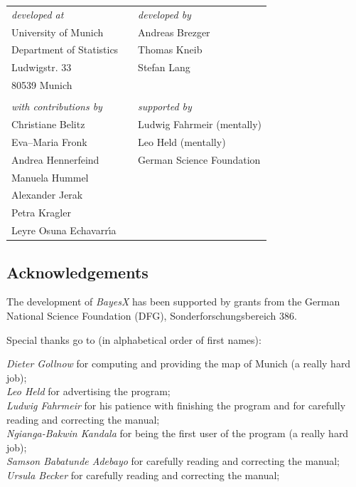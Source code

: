 \begin{table}[ht]
\begin{center}
\begin{tabular}{lll}
{\em developed at} & \hspace{1.5cm} & {\em developed by} \\
University of Munich & \hspace{1.5cm} & Andreas Brezger \\
Department of Statistics & \hspace{1.5cm} & Thomas Kneib \\
Ludwigstr. 33 & \hspace{1.5cm} & Stefan Lang \\
80539 Munich & \hspace{1.5cm} & \\
  & & \\
{\em with contributions by}  &  \hspace{1.5cm} &  {\em supported by} \\
Christiane Belitz&  \hspace{1.5cm} & Ludwig Fahrmeir (mentally) \\
Eva--Maria Fronk  & \hspace{1.5cm} & Leo Held (mentally) \\
Andrea Hennerfeind & \hspace{1.5cm} & German Science Foundation  \\
Manuela Hummel & \\
Alexander Jerak & \\
Petra Kragler & \\
Leyre Osuna Echavarr\'{\i}a& \\
\end{tabular}
\end{center}
\end{table}


\newpage

\subsection*{Acknowledgements}

The development of {\em BayesX} has been supported by grants from
the German National Science Foundation (DFG),
Sonderforschungsbereich 386.

Special thanks go to (in alphabetical order of first names):

{\em Dieter Gollnow} for computing and providing the map of Munich (a really hard job); \\
{\em Leo Held} for advertising the program; \\
{\em Ludwig Fahrmeir} for his patience with finishing the program
and for carefully
reading and correcting the  manual; \\
{\em Ngianga-Bakwin Kandala} for being the first user of the program (a really hard job); \\
{\em Samson Babatunde Adebayo} for carefully reading and correcting the manual; \\
{\em Ursula Becker} for carefully reading and correcting the
manual;

